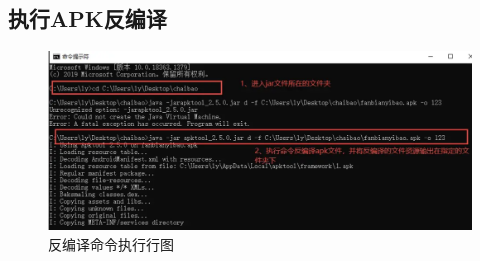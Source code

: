 \subsection{执行APK反编译}
\begin{figure}
    \centering
    \includegraphics[scale=0.5]{resources/img/i19.png}
    \caption{反编译命令执行行图}
  \end{figure}

